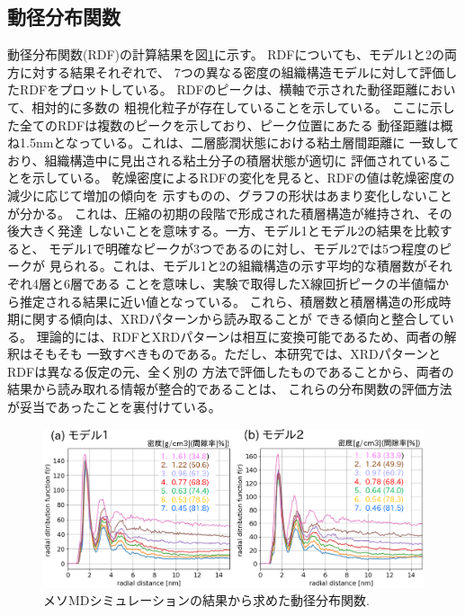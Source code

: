 \subsection{動径分布関数}
動径分布関数(RDF)の計算結果を図\ref{fig:fig7}に示す。
RDFについても、モデル1と2の両方に対する結果それぞれで、
7つの異なる密度の組織構造モデルに対して評価したRDFをプロットしている。
RDFのピークは、横軸で示された動径距離において、相対的に多数の
粗視化粒子が存在していることを示している。
ここに示した全てのRDFは複数のピークを示しており、ピーク位置にあたる
動径距離は概ね1.5nmとなっている。これは、二層膨潤状態における粘土層間距離に
一致しており、組織構造中に見出される粘土分子の積層状態が適切に
評価されていることを示している。
乾燥密度によるRDFの変化を見ると、RDFの値は乾燥密度の減少に応じて増加の傾向を
示すものの、グラフの形状はあまり変化しないことが分かる。
これは、圧縮の初期の段階で形成された積層構造が維持され、その後大きく発達
しないことを意味する。一方、モデル1とモデル2の結果を比較すると、
モデル1で明確なピークが3つであるのに対し、モデル2では5つ程度のピークが
見られる。これは、モデル1と2の組織構造の示す平均的な積層数がそれぞれ4層と6層である
ことを意味し、実験で取得したX線回折ピークの半値幅から推定される結果に近い値となっている。
これら、積層数と積層構造の形成時期に関する傾向は、XRDパターンから読み取ることが
できる傾向と整合している。
理論的には、RDFとXRDパターンは相互に変換可能であるため、両者の解釈はそもそも
一致すべきものである。ただし、本研究では、XRDパターンとRDFは異なる仮定の元、全く別の
方法で評価したものであることから、両者の結果から読み取れる情報が整合的であることは、
これらの分布関数の評価方法が妥当であったことを裏付けている。
\begin{figure}[h]
	\begin{center}
	\includegraphics[width=1.0\linewidth]{Figs/fig7.eps} 
	\end{center}
	\caption{
		メソMDシミュレーションの結果から求めた動径分布関数.
	} 
	\label{fig:fig7}
\end{figure}
